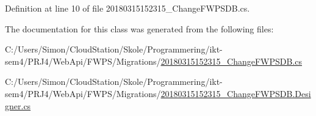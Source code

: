 Definition at line 10 of file 20180315152315\+\_\+\+Change\+F\+W\+P\+S\+D\+B.\+cs.



The documentation for this class was generated from the following files\+:\begin{DoxyCompactItemize}
\item 
C\+:/\+Users/\+Simon/\+Cloud\+Station/\+Skole/\+Programmering/ikt-\/sem4/\+P\+R\+J4/\+Web\+Api/\+F\+W\+P\+S/\+Migrations/\mbox{\hyperlink{20180315152315___change_f_w_p_s_d_b_8cs}{20180315152315\+\_\+\+Change\+F\+W\+P\+S\+D\+B.\+cs}}\item 
C\+:/\+Users/\+Simon/\+Cloud\+Station/\+Skole/\+Programmering/ikt-\/sem4/\+P\+R\+J4/\+Web\+Api/\+F\+W\+P\+S/\+Migrations/\mbox{\hyperlink{20180315152315___change_f_w_p_s_d_b_8_designer_8cs}{20180315152315\+\_\+\+Change\+F\+W\+P\+S\+D\+B.\+Designer.\+cs}}\end{DoxyCompactItemize}
